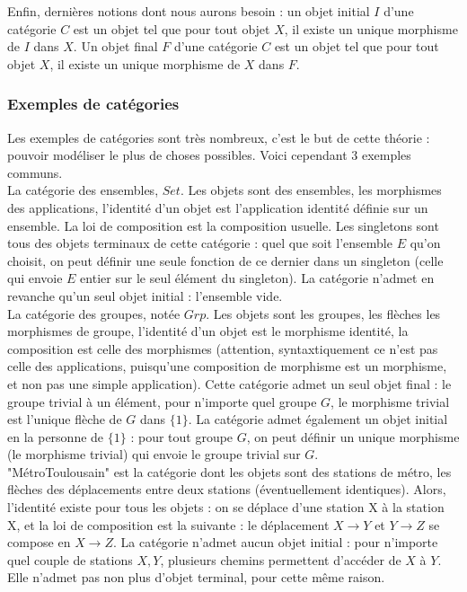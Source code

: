 \documentclass{article}
\begin{document}
Enfin, dernières notions dont nous aurons besoin : un objet initial $I$ d'une catégorie $C$
est un objet tel que pour tout objet $X$, il existe un unique morphisme de $I$ dans $X$. Un objet final $F$ d'une catégorie $C$ est un objet tel que pour tout objet $X$, il existe un unique morphisme de $ X$ dans $F$.

\subsubsection{Exemples de catégories}

Les exemples de catégories sont très nombreux, c'est le but de cette théorie : pouvoir modéliser le plus de choses possibles. Voici cependant 3 exemples communs. \\  
La catégorie des ensembles, $Set$. Les objets sont des ensembles, les morphismes des applications, l'identité d'un objet est l'application identité définie sur un ensemble. La loi de composition est la composition usuelle. Les singletons sont tous des objets terminaux de cette catégorie : quel que soit l'ensemble $E$ qu'on choisit, on peut définir une seule fonction de ce dernier dans un singleton (celle qui envoie $E$ entier sur le seul élément du singleton). La catégorie n'admet en revanche qu'un seul objet initial : l'ensemble vide.  
\\ 
La catégorie des groupes, notée $Grp$. Les objets sont les groupes, les flèches les morphismes de groupe, l'identité d'un objet est le morphisme identité, la composition est celle des morphismes (attention, syntaxtiquement ce n'est pas celle des applications, puisqu'une composition de morphisme est un morphisme, et non pas une simple application). Cette catégorie admet un seul objet final : le groupe trivial à un élément, pour n'importe quel groupe $G$, le morphisme trivial est l'unique flèche de $G$ dans $\{ 1 \}$. La catégorie admet également un objet initial en la personne de $\{ 1 \}$ : pour tout groupe $G$, on peut définir un unique morphisme (le morphisme trivial) qui envoie le groupe trivial sur $G$.
\\ 
"MétroToulousain" est la catégorie dont les objets sont des stations de métro, les flèches des déplacements entre deux stations (éventuellement identiques). Alors, l'identité existe pour tous les objets : on se déplace d'une station X à la station X, et la loi de composition est la suivante :  le déplacement $X \rightarrow Y$ et $ Y \rightarrow Z$ se compose en $X \rightarrow Z$. La catégorie n'admet aucun objet initial : pour n'importe quel couple de stations $X,Y$, plusieurs chemins permettent d'accéder de $X$ à $Y$. Elle n'admet pas non plus d'objet terminal, pour cette même raison.
\end{document}
